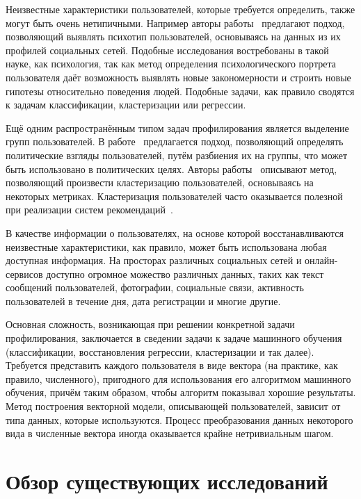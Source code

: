 Неизвестные характеристики пользователей, которые требуется
определить, также могут быть очень нетипичными. Например
авторы работы~\cite{schwartz2013personality} предлагают
подход, позволяющий выявлять психотип пользователей, основываясь
на данных из их профилей социальных сетей. Подобные исследования
востребованы в такой науке, как психология, так как метод
определения психологического портрета пользователя даёт
возможность выявлять новые закономерности и строить новые
гипотезы относительно поведения людей. Подобные задачи,
как правило сводятся к задачам классификации, кластеризации
или регрессии.

Ещё одним распространённым типом задач профилирования является
выделение групп пользователей. В работе~\cite{barbera2015tweeting}
предлагается подход, позволяющий определять политические взгляды
пользователей, путём разбиения их на группы, что может быть
использовано в политических целях. Авторы 
работы~\cite{maia2008identifying} описывают метод, позволяющий
произвести кластеризацию пользователей, основываясь на некоторых
метриках. Кластеризация пользователей часто оказывается полезной
при реализации систем рекомендаций~\cite{sarwar2002recommender}.

В качестве информации о пользователях, на основе которой
восстанавливаются неизвестные характеристики, как правило,
может быть использована любая доступная информация. На просторах
различных социальных сетей и онлайн-сервисов доступно огромное
можество различных данных, таких как текст сообщений пользователей,
фотографии, социальные связи, активность пользователей в течение
дня, дата регистрации и многие другие.

Основная сложность, возникающая при решении конкретной задачи
профилирования, заключается в сведении задачи к задаче машинного
обучения (классификации, восстановления регрессии, кластеризации и
так далее). Требуется представить каждого пользователя в
виде вектора (на практике, как правило, численного), пригодного для
использования его алгоритмом машинного обучения, причём таким образом,
чтобы алгоритм показывал хорошие результаты. Метод построения векторной
модели, описывающей пользователей, зависит от типа данных,
которые используются. Процесс преобразования данных некоторого вида в
численные вектора иногда оказывается крайне нетривиальным шагом.

\section{Обзор существующих исследований}
\label{sec:previous_work}

